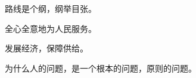%
%
%
%
%
%
%
\null%
\vspace{2.5\baselineskip}
\sffamily%
\begin{center}
{%
	\huge\bfseries%
	{}
}
\end{center}

\begingroup%
\Large\bfseries%
\doublespacing%
\setlength{\parindent}{1.818181em}%
\begin{list}{}{%
	\setlength{\topsep}{0pt}%
	\setlength{\leftmargin}{-.363636em}%
	\setlength{\rightmargin}{-.363636em}%
	\setlength{\listparindent}{\parindent}%
	\setlength{\itemindent}{\parindent}%
	\setlength{\parsep}{\parskip}%
}%
\item[]%

路线是个纲，纲举目张。

全心全意地为人民服务。

发展经济，保障供给。

为什么人的问题，是一个根本的问题，原则的问题。

\end{list}
\endgroup%

